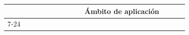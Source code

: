 \begin{table}[]
\begin{tabular}{ccc|c|cccllcllllllllllllll|}
                                                  & \multicolumn{2}{c|}{}                                                                                                                                                                                                                                                                                                       &                                                                                                                                                                                                                                                                                                                                                             & \multicolumn{2}{c|}{}                                                                                                                                                                                                                                                                                                                                    & \multicolumn{18}{c|}{Ámbito de aplicación}                                                                                                                                                                                                                                                                                                                                                                                                                                                                                                                                  \\ \cline{7-24} 

\end{tabular}
\end{table}
